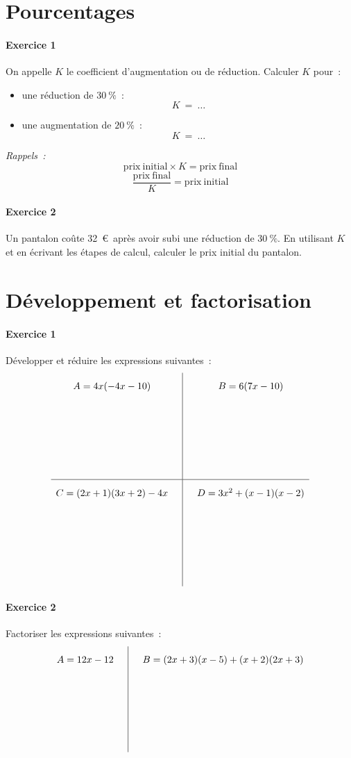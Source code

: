 \documentclass[a4paper]{article}
\begin{document}
  \section*{Pourcentages}
  \paragraph{Exercice 1}
  On appelle $K$ le coefficient d'augmentation ou de réduction. Calculer $K$ pour~:
  \begin{itemize}
    \item une réduction de $30~\%$~:
      \[
        K \ =\ \dots
      \]
    \item une augmentation de $20~\%$~:
      \[
        K \ =\ \dots
      \]
  \end{itemize}
  \emph{Rappels~:}
  \[
    \mathrm{prix\ initial} \times K = \mathrm{prix\ final}
  \]
  \[
    \frac{\mathrm{prix\ final}}{K} = \mathrm{prix\ initial}
  \]

  \paragraph{Exercice 2}
  Un pantalon coûte 32~\euro\ après avoir subi une réduction de $30~\%$. En utilisant $K$ et en écrivant les étapes de calcul, calculer le prix initial du pantalon.
  \vspace{3cm}

  \section*{Développement et factorisation}
  \paragraph{Exercice 1}
  Développer et réduire les expressions suivantes~:
  \[
    \def\arraystretch{2}
    \begin{array}{c|c}
      A = 4x (-4x - 10) \quad&\quad B = 6(7x - 10)\\[3cm]
      \hline
      C = (2x + 1)(3x + 2) - 4x \quad&\quad D = 3x^2 + (x - 1)(x - 2)\\[3cm]
    \end{array}
  \]

  \paragraph{Exercice 2}
  Factoriser les expressions suivantes~:
  \[
    \def\arraystretch{2}
    \begin{array}{c|c}
      A = 12x - 12 \quad&\quad B = (2x+3)(x-5) + (x+2)(2x+3)\\[3cm]
    \end{array}
  \]  
\end{document}
